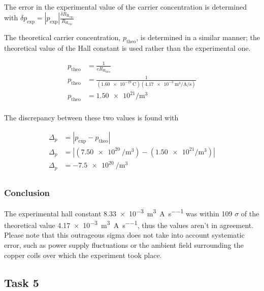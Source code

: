 \documentclass[a4paper]{article}
\begin{document}
The error in the experimental value of the carrier concentration is determined
with \( \delta p_{\text{exp}} = | p_{\text{exp}} | \frac{\delta
  R_{\text{H}_{\text{exp}}}}{R_{\text{H}_{\text{exp}}}} \)

\qq The theoretical carrier concentration, \( p_{\text{theo}} \), is determined in a
similar manner; the theoretical value of the Hall constant is used rather than
the experimental one.

\begin{align*}
  p_{\text{theo}} &= \frac{1}{\si{\elementarycharge} R_{\text{H}_{\text{theo}}}}
  \\
  p_{\text{theo}} &= \frac{1}{(\SI{1.60e-19}{\coulomb})
                    (\SI{4.17e-3}{\cubic\meter\per\ampere\per\second})} \\
  p_{\text{theo}} &= \num{1.50e21} \si{\per\cubic\meter} \\
\end{align*}

The discrepancy between these two values is found with

\begin{align*}
  \Delta_p &= | p_{\text{exp}} - p_{\text{theo}} | \\
  \Delta_p &= | (\SI{7.50e20}{\per\cubic\meter}) - (\num{1.50e21}
             \si{\per\cubic\meter}) | \\
  \Delta_p &= \SI{-7.5e20}{\per\cubic\meter} \\
\end{align*}



\subsubsection{Conclusion}
\qq The experimental hall constant
\SI{8.33e-3}{\cubic\meter\per\ampere\per\second} was within 109 $\sigma$ of the 
theoretical value \SI{4.17e-3}{\cubic\meter\per\ampere\per\second}, thus the
values aren't in agreement. Please note that this outrageous sigma does not take
into account systematic error, such as power supply fluctuations or the ambient
field surrounding the copper coils over which the experiment took place. 

\subsection{Task 5}
\end{document}
